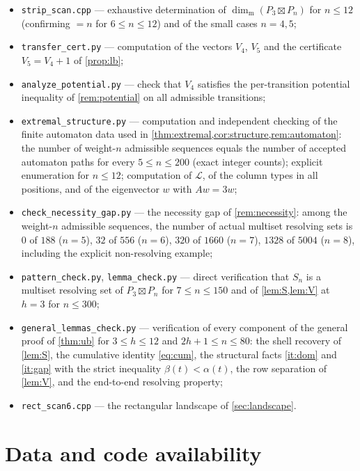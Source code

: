 \documentclass[11pt]{amsart}
\theoremstyle{remark}
\newcommand{\mdim}{\operatorname{dim}_{\mathrm m}}
\begin{document}
\begin{itemize}[leftmargin=2em]
\item \texttt{strip\_scan.cpp} --- exhaustive determination of $\mdim(P_3\boxtimes P_n)$ for $n\le 12$ (confirming $=n$ for $6\le n\le 12$) and of the small cases $n=4,5$;
\item \texttt{transfer\_cert.py} --- computation of the vectors $V_4$, $V_5$ and the certificate $V_5=V_4+1$ of \cref{prop:lb};
\item \texttt{analyze\_potential.py} --- check that $V_4$ satisfies the per-transition potential inequality of \cref{rem:potential} on all admissible transitions;
\item \texttt{extremal\_structure.py} --- computation and independent checking of the finite automaton data used in \cref{thm:extremal,cor:structure,rem:automaton}: the number of weight-$n$ admissible sequences equals the number of accepted automaton paths for every $5\le n\le 200$ (exact integer counts); explicit enumeration for $n\le 12$; computation of $\mathcal L$, of the column types in all positions, and of the eigenvector $w$ with $Aw=3w$;
\item \texttt{check\_necessity\_gap.py} --- the necessity gap of \cref{rem:necessity}: among the weight-$n$ admissible sequences, the number of actual multiset resolving sets is $0$ of $188$ ($n=5$), $32$ of $556$ ($n=6$), $320$ of $1660$ ($n=7$), $1328$ of $5004$ ($n=8$), including the explicit non-resolving example;
\item \texttt{pattern\_check.py}, \texttt{lemma\_check.py} --- direct verification that $S_n$ is a multiset resolving set of $P_3\boxtimes P_n$ for $7\le n\le 150$ and of \cref{lem:S,lem:V} at $h=3$ for $n\le 300$;
\item \texttt{general\_lemmas\_check.py} --- verification of every component of the general proof of \cref{thm:ub} for $3\le h\le 12$ and $2h+1\le n\le 80$: the shell recovery of \cref{lem:S}, the cumulative identity \eqref{eq:cum}, the structural facts \ref{it:dom} and \ref{it:gap} with the strict inequality $\beta(t)<\alpha(t)$, the row separation of \cref{lem:V}, and the end-to-end resolving property;
\item \texttt{rect\_scan6.cpp} --- the rectangular landscape of \cref{sec:landscape}.
\end{itemize}

\section*{Data and code availability}
\end{document}
